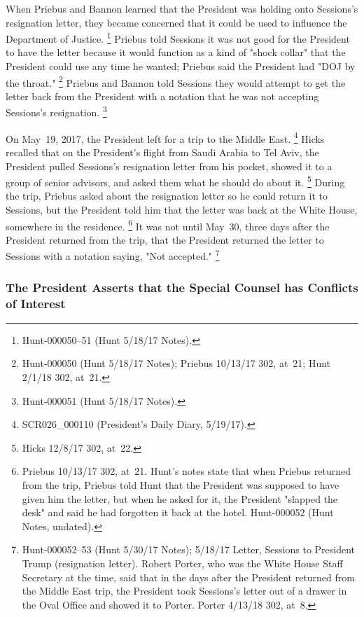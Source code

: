When Priebus and Bannon learned that the President was holding onto Sessions's resignation letter, they became concerned that it could be used to influence the Department of Justice.%
\footnote{Hunt-000050--51 (Hunt 5/18/17 Notes).}
Priebus told Sessions it was not good for the President to have the letter because it would function as a kind of "shock collar" that the President could use any time he wanted;
Priebus said the President had "DOJ by the throat."%
\footnote{Hunt-000050 (Hunt 5/18/17 Notes);
Priebus 10/13/17 302, at~21;
Hunt 2/1/18 302, at~21.}
Priebus and Bannon told Sessions they would attempt to get the letter back from the President with a notation that he was not accepting Sessions's resignation.%
\footnote{Hunt-000051 (Hunt 5/18/17 Notes).}

On May~19, 2017, the President left for a trip to the Middle East.%
\footnote{SCR026\_000110 (President's Daily Diary, 5/19/17).}
Hicks recalled that on the President's flight from Saudi Arabia to Tel Aviv, the President pulled Sessions's resignation letter from his pocket, showed it to a group of senior advisors, and asked them what he should do about it.%
\footnote{Hicks 12/8/17 302, at~22.}
During the trip, Priebus asked about the resignation letter so he could return it to Sessions, but the President told him that the letter was back at the White House, somewhere in the residence.%
\footnote{Priebus 10/13/17 302, at~21.
Hunt's notes state that when Priebus returned from the trip, Priebus told Hunt that the President was supposed to have given him the letter, but when he asked for it, the President "slapped the desk" and said he had forgotten it back at the hotel.
Hunt-000052 (Hunt Notes, undated).}
It was not until May~30, three days after the President returned from the trip, that the President returned the letter to Sessions with a notation saying, "Not accepted."%
\footnote{Hunt-000052--53 (Hunt 5/30/17 Notes);
5/18/17 Letter, Sessions to President Trump (resignation letter).
Robert Porter, who was the White House Staff Secretary at the time, said that in the days after the President returned from the Middle East trip, the President took Sessions's letter out of a drawer in the Oval Office and showed it to Porter.
Porter 4/13/18 302, at~8.
}

\subsubsection{The President Asserts that the Special Counsel has Conflicts of Interest}

